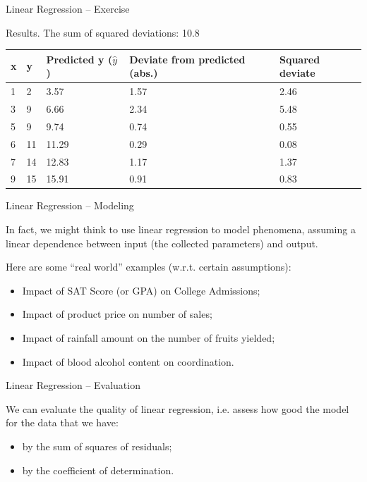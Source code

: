 \documentclass{beamer}
\begin{document}

\begin{frame}
{\centerline{Linear Regression -- Exercise}}

Results. The sum of squared deviations: 10.8
\small
\begin{table}[]
\centering
\begin{tabular}{l | l | l | l| l} 
\toprule
x & y & Predicted y ($\hat{y}$) & Deviate from predicted (abs.) & Squared deviate \\
\midrule

1 & 2 & 3.57 & 1.57 & 2.46 \\
3 & 9 & 6.66 & 2.34 & 5.48 \\
5 & 9 & 9.74 & 0.74 & 0.55 \\
6 & 11 & 11.29 & 0.29 & 0.08 \\
7 & 14 & 12.83 & 1.17 & 1.37 \\
9 & 15 & 15.91 & 0.91 & 0.83 \\

\bottomrule

\end{tabular}
\end{table}
\end{frame}


\begin{frame}
{\centerline{Linear Regression -- Modeling}}
In fact, we might think to use linear regression to model phenomena, assuming a linear dependence between input (the collected parameters) and output. 

Here are some “real world” examples (w.r.t. certain assumptions):

\begin{itemize}
\item Impact of SAT Score (or GPA) on College Admissions;
\item Impact of product price on number of sales;
\item Impact of rainfall amount on the number of fruits yielded;
\item Impact of blood alcohol content on coordination.
\end{itemize}

\end{frame}

\begin{frame}
{\centerline{Linear Regression -- Evaluation}}
We can evaluate the quality of linear regression, i.e. assess how good the model for the data that we have:

\begin{itemize}
\item by the sum of squares of residuals;
\item by the coefficient of determination.
\end{itemize}



\end{frame}
\end{document}
